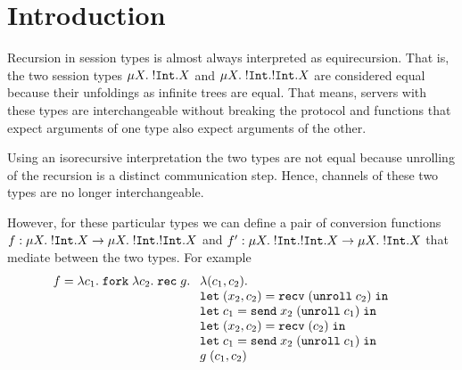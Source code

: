 
\section{Introduction}
\label{sec:introduction}

Recursion in session types is almost always interpreted as
equirecursion. That is, the two session types $\mu X.\;{{}!\mathtt{Int}.X} $
and $\mu X.\;{{}!\mathtt{Int}.{}!\mathtt{Int}.X} $ are considered equal because
their unfoldings as infinite trees are equal. That means, servers with
these types are interchangeable without breaking the protocol and
functions that expect arguments of one type also expect arguments of
the other.

Using an isorecursive interpretation the two types are not equal
because unrolling of the recursion is a distinct communication
step. Hence, channels of these two types are no longer
interchangeable.

However, for these particular types we can define a pair of conversion
functions
$f : \mu X.\;{{}!\mathtt{Int}.X} \rightarrow \mu X.\;{{}!\mathtt{Int}.{}!\mathtt{Int}.X}$
and
$f' : \mu X.\;{{}!\mathtt{Int}.{}!\mathtt{Int}.X} \rightarrow \mu X.\;{{}!\mathtt{Int}.X}$
that mediate between the two types. For example
\begin{align*}
  f &=       \ELam {c_1} \EFork{ \ELam {c_2} \ERec g %
      \begin{array}[t]{l}
      \ELam{(c_1, c_2)} \\
      \ELet{(x_2,c_2)}{\ERecv{(\EUnroll{c_2})}} \\
      \ELet{c_1}{\ESend{x_2}{(\EUnroll{c_1})}} \\
      \ELet{(x_2,c_2)}{\ERecv{({c_2})}} \\
      \ELet{c_1}{\ESend{x_2}{(\EUnroll{c_1})}} \\
        g \; ({c_1}, {c_2}) %
      \end{array}}
\end{align*}

